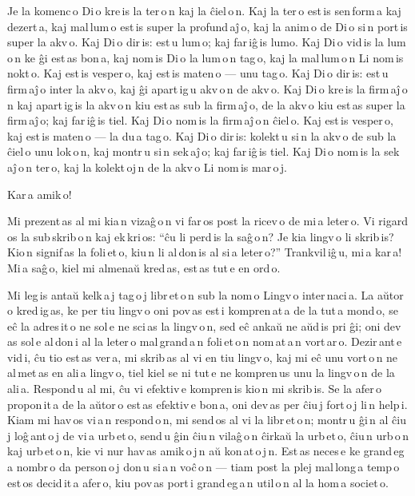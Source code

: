 \documentclass[12pt,twoside]{book}
\begin{document}

Je la komenc\,o Di\,o kre\,is la ter\,o\,n kaj la ĉiel\,o\,n. Kaj la ter\,o est\,is sen\,form\,a kaj dezert\,a, kaj mal\,lum\,o est\,is super la profund\,aĵ\,o, kaj la anim\,o de Di\,o si\,n port\,is super la akv\,o. Kaj Di\,o dir\,is: est\,u lum\,o; kaj far\,iĝ\,is lumo. Kaj Di\,o vid\,is la lum\,o\,n ke ĝi est\,as bon\,a, kaj nom\,is Di\,o la lum\,o\,n tag\,o, kaj la mal\,lum\,o\,n Li nom\,is nokt\,o. Kaj est\,is vesper\,o, kaj est\,is maten\,o --- unu tag\,o. Kaj Di\,o dir\,is: est\,u firm\,aĵ\,o inter la akv\,o, kaj ĝi apart\,ig\,u akv\,o\,n de akv\,o. Kaj Di\,o kre\,is la firm\,aĵ\,o\,n kaj apart\,ig\,is la akv\,o\,n kiu est\,as sub la firm\,aĵ\,o, de la akv\,o kiu est\,as super la firm\,aĵ\,o; kaj far\,iĝ\,is tiel. Kaj Di\,o nom\,is la firm\,aĵ\,o\,n ĉiel\,o. Kaj est\,is vesper\,o, kaj est\,is maten\,o --- la du\,a tag\,o. Kaj Di\,o dir\,is: kolekt\,u si\,n la akv\,o de sub la ĉiel\,o unu lok\,o\,n, kaj montr\,u si\,n sek\,aĵ\,o; kaj far\,iĝ\,is tiel. Kaj Di\,o nom\,is la sek\,aĵ\,o\,n ter\,o, kaj la kolekt\,oj\,n de la akv\,o Li nom\,is mar\,o\,j.


\hspace{5em} Kar\,a amik\,o!

Mi prezent\,as al mi kia\,n vizaĝ\,o\,n vi far\,os post la ricev\,o de mi\,a leter\,o. Vi rigard\,os la sub\,skrib\,o\,n kaj ek\,kri\,os: “ĉu li perd\,is la saĝ\,o\,n? Je kia lingv\,o li skrib\,is? Kio\,n signif\,as la foli\,et\,o, kiu\,n li al\,don\,is al si\,a leter\,o?” Trankvil\,iĝ\,u, mi\,a kar\,a! Mi\,a saĝ\,o, kiel mi almenaŭ kred\,as, est\,as tut\,e en ord\,o.

Mi leg\,is antaŭ kelk\,a\,j tag\,o\,j libr\,et\,o\,n sub la nom\,o \glqq{}Lingv\,o inter\,naci\,a\grqq{}. La aŭtor\,o kred\,ig\,as, ke per tiu lingv\,o oni pov\,as est\,i kompren\,at\,a de la tut\,a mond\,o, se eĉ la adres\,it\,o ne sol\,e ne sci\,as la lingv\,o\,n, sed eĉ ankaŭ ne aŭd\,is pri ĝi; oni dev\,as sol\,e al\,don\,i al la leter\,o mal\,grand\,a\,n foli\,et\,o\,n nom\,at\,a\,n \glqq{}vort\,ar\,o\grqq{}. Dezir\,ant\,e vid\,i, ĉu tio est\,as ver\,a, mi skrib\,as al vi en tiu lingv\,o, kaj mi eĉ unu vort\,o\,n ne al\,met\,as en ali\,a lingv\,o, tiel kiel se ni tut\,e ne kompren\,us unu la lingv\,o\,n de la ali\,a. Respond\,u al mi, ĉu vi efektiv\,e kompren\,is kio\,n mi skrib\,is. Se la afer\,o propon\,it\,a de la aŭtor\,o est\,as efektiv\,e bon\,a, oni dev\,as per ĉiu\,j fort\,o\,j li\,n help\,i. Kiam mi hav\,os vi\,a\,n respond\,o\,n, mi send\,os al vi la libr\,et\,o\,n; montr\,u ĝi\,n al ĉiu\,j loĝ\,ant\,o\,j de vi\,a urb\,et\,o, send\,u ĝin ĉiu\,n vilaĝ\,o\,n ĉirkaŭ la urb\,et\,o, ĉiu\,n urb\,o\,n kaj urb\,et\,o\,n, kie vi nur hav\,as amik\,o\,j\,n aŭ kon\,at\,o\,j\,n. Est\,as neces\,e ke grand\,eg\,a nombr\,o da person\,o\,j don\,u si\,a\,n voĉ\,o\,n --- tiam post la plej mal\,long\,a temp\,o est\,os decid\,it\,a afer\,o, kiu pov\,as port\,i grand\,eg\,a\,n util\,o\,n al la hom\,a societ\,o.
\end{document}
